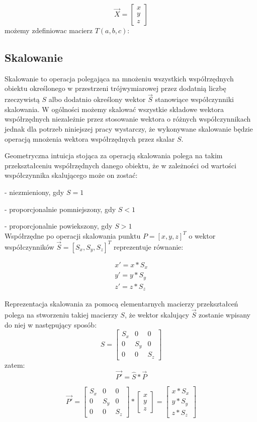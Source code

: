 \documentclass[licencjacka]{pracamgr}
\begin{document}
$$
\vec{X}=\begin{bmatrix}
x \\
y \\
z
\end{bmatrix}
$$
możemy zdefiniowac macierz $T(a,b,c)$:

\subsection{Skalowanie}
Skalowanie to operacja polegająca na mnożeniu wszystkich współrzędnych obiektu określonego w przestrzeni trójwymiarowej przez dodatnią liczbę rzeczywistą $S$ albo dodatnio określony wektor $\vec{S}$ stanowiące współczynniki skalowania. W ogólności możemy skalować wszystkie składowe wektora współrzędnych niezależnie przez stosowanie wektora o różnych współczynnikach jednak dla potrzeb niniejszej pracy wystarczy, że wykonywane skalowanie będzie operacją mnożenia wektora współrzędnych przez skalar $S$.

Geometryczna intuicja stojąca za operacją skalowania polega na takim przekształceniu współrzędnych danego obiektu, że w zależności od wartości współczynnika skalującego może on zostać: 

- niezmieniony, gdy $S=1$

- proporcjonalnie pomniejszony, gdy $S<1$

- proporcjonalnie powiekszony, gdy $S>1$
\\
Współrzędne po operacji skalowania punktu $P=[x,y,z]^T$ o wektor współczynników $\vec{S}=[S_x,S_y,S_z]^T$ reprezentuje równanie:

$$
\begin{array}{lr}
x'=x*S_x \\
y'=y*S_y \\
z'=z*S_z
\end{array}
$$

Reprezentacja skalowania za pomocą elementarnych macierzy przekształceń polega na stworzeniu takiej macierzy $S$, że wektor skalujący $\vec{S}$ zostanie wpisany do niej w następujący sposób:
$$
\hat{S}=
\begin{bmatrix}
S_x & 0 & 0 \\
0 & S_y & 0 \\
0 & 0 & S_z
\end{bmatrix}
$$
zatem:
$$
\vec{P'}=\hat{S}*\vec{P}
$$

$$
\vec{P'}
=
\begin{bmatrix}
S_x & 0 & 0 \\
0 & S_y & 0 \\
0 & 0 & S_z
\end{bmatrix}
*
\begin{bmatrix} 
x \\ 
y \\ 
z 
\end{bmatrix} 
=
\begin{bmatrix} 
x*S_x \\ 
y*S_y \\ 
z*S_z 
\end{bmatrix}
$$
\end{document}
